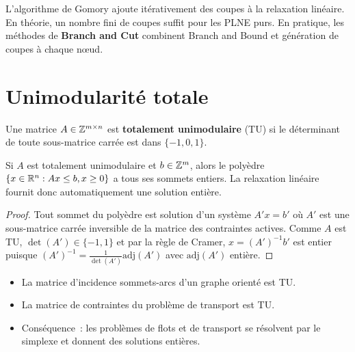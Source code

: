 \begin{remarque}
L'algorithme de Gomory ajoute it\'erativement des coupes \`a la relaxation
lin\'eaire. En th\'eorie, un nombre fini de coupes suffit pour les PLNE purs.
En pratique, les m\'ethodes de \textbf{Branch and Cut} combinent Branch and
Bound et g\'en\'eration de coupes \`a chaque n\oe ud.
\end{remarque}

\section{Unimodularit\'e totale}

\begin{definition}
Une matrice $A \in \mathbb{Z}^{m \times n}$ est \textbf{totalement unimodulaire} (TU)
si le d\'eterminant de toute sous-matrice carr\'ee est dans $\{-1, 0, 1\}$.
\end{definition}

\begin{theoreme}
Si $A$ est totalement unimodulaire et $b \in \mathbb{Z}^m$, alors le poly\`edre
$\{x \in \mathbb{R}^n : Ax \leq b, x \geq 0\}$ a tous ses sommets entiers. La
relaxation lin\'eaire fournit donc automatiquement une solution enti\`ere.
\end{theoreme}

\begin{proof}
Tout sommet du poly\`edre est solution d'un syst\`eme $A' x = b'$ o\`u
$A'$ est une sous-matrice carr\'ee inversible de la matrice des contraintes
actives. Comme $A$ est TU, $\det(A') \in \{-1, 1\}$ et par la r\`egle de
Cramer, $x = (A')^{-1} b'$ est entier puisque
$(A')^{-1} = \frac{1}{\det(A')} \mathrm{adj}(A')$ avec $\mathrm{adj}(A')$
enti\`ere.
\end{proof}

\begin{exemple}
\begin{itemize}
  \item La matrice d'incidence sommets-arcs d'un graphe orient\'e est TU.
  \item La matrice de contraintes du probl\`eme de transport est TU.
  \item Cons\'equence~: les probl\`emes de flots et de transport se r\'esolvent
        par le simplexe et donnent des solutions enti\`eres.
\end{itemize}
\end{exemple}

